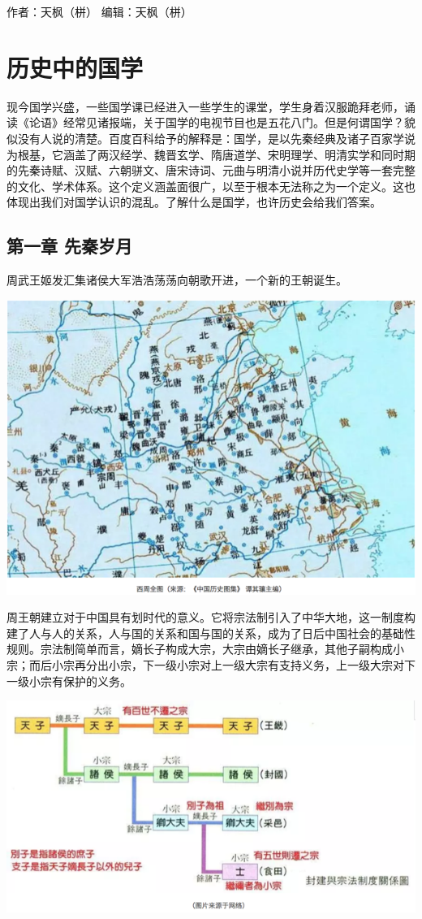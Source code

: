 \documentclass[]{book}
\begin{document}
作者：天枫（栟） 编辑：天枫（栟）

\section{历史中的国学}

现今国学兴盛，一些国学课已经进入一些学生的课堂，学生身着汉服跪拜老师，诵读《论语》经常见诸报端，关于国学的电视节目也是五花八门。但是何谓国学？貌似没有人说的清楚。百度百科给予的解释是：国学，是以先秦经典及诸子百家学说为根基，它涵盖了两汉经学、魏晋玄学、隋唐道学、宋明理学、明清实学和同时期的先秦诗赋、汉赋、六朝骈文、唐宋诗词、元曲与明清小说并历代史学等一套完整的文化、学术体系。这个定义涵盖面很广，以至于根本无法称之为一个定义。这也体现出我们对国学认识的混乱。了解什么是国学，也许历史会给我们答案。

\subsection{第一章 先秦岁月}\label{-}

周武王姬发汇集诸侯大军浩浩荡荡向朝歌开进，一个新的王朝诞生。

\includegraphics[width=8.33in]{images/gx1}

周王朝建立对于中国具有划时代的意义。它将宗法制引入了中华大地，这一制度构建了人与人的关系，人与国的关系和国与国的关系，成为了日后中国社会的基础性规则。宗法制简单而言，嫡长子构成大宗，大宗由嫡长子继承，其他子嗣构成小宗；而后小宗再分出小宗，下一级小宗对上一级大宗有支持义务，上一级大宗对下一级小宗有保护的义务。

\includegraphics[width=8.33in]{images/gx2}
\end{document}
